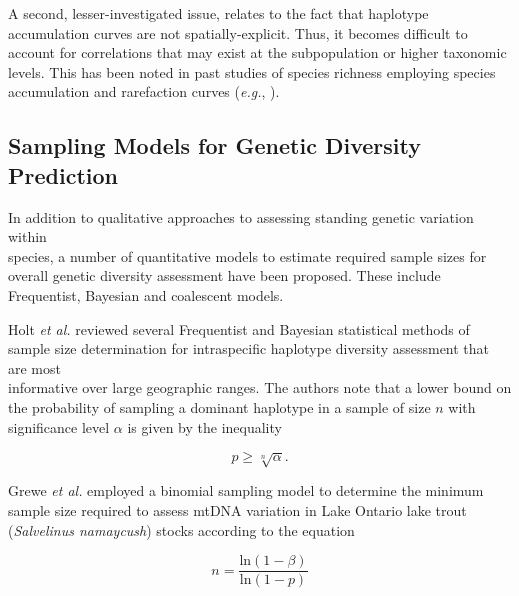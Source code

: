 A second, lesser-investigated issue, relates to the fact that haplotype accumulation curves are not spatially-explicit. Thus, it becomes difficult to account for correlations that may exist at the subpopulation or higher taxonomic levels. This has been noted in past studies of species richness employing species accumulation and rarefaction curves (\textit{e.g.}, \cite{bevilacqua2017approach, chiarucci2009spatially, terlizzi2014species}).



\subsection{Sampling Models for Genetic Diversity Prediction}

In addition to qualitative approaches to assessing standing genetic variation within \\ species, a number of quantitative models to estimate required sample sizes for overall genetic diversity assessment have been proposed. These include Frequentist, Bayesian and coalescent models.



Holt \textit{et al.} \cite{holt2007experimental} reviewed several Frequentist and Bayesian statistical methods of sample size determination for intraspecific haplotype diversity assessment that are most \\ informative over large geographic ranges. The authors note that a lower bound on the probability of sampling a dominant haplotype in a sample of size $n$ with significance level $\alpha$ is given by the inequality

\begin{equation}
p \geq \sqrt[n]{\alpha}.
\end{equation}



Grewe \textit{et al.} \cite{grewe1993mitochondrial} employed a binomial sampling model to determine the minimum sample size required to assess mtDNA variation in Lake Ontario lake trout (\textit{Salvelinus namaycush}) stocks according to the equation

\begin{equation}
n=\frac{\textrm{ln}(1 - \beta)}{\textrm{ln}(1 - p)}
\end{equation}



